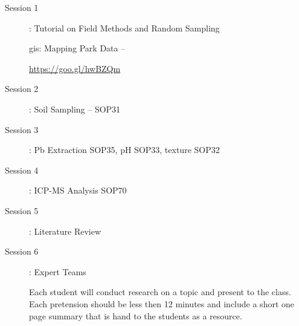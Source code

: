 \documentclass{article}\usepackage[]{graphicx}\usepackage[]{color}
\begin{document}
\begin{description}

\item[Session 1]: Tutorial on Field Methods and Random Sampling


gis: Mapping Park Data -- 

\url{https://goo.gl/hwBZQm}

\item[Session 2]: Soil Sampling -- SOP31

\item[Session 3]: Pb Extraction SOP35, pH SOP33, texture SOP32

\item[Session 4]: ICP-MS Analysis SOP70

\item[Session 5]: Literature Review 

\item[Session 6]: Expert Teams

Each student will conduct research on a topic and present to the class. Each pretension should be less then 12 minutes and include a short one page summary that is hand to the students as a resource. 


\end{description}
\end{document}
